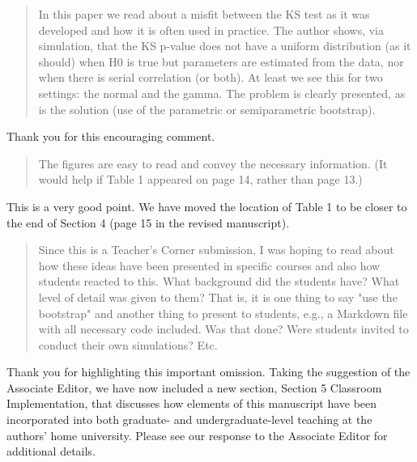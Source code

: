 \documentclass[12pt]{article}
\newenvironment{comment}%
{\begin{quotation}\noindent\small\it\color{darkblue}\ignorespaces%
}{\end{quotation}}
\begin{document}
\begin{comment}
In this paper we read about a misfit between the KS test as it was developed and 
how it is often used in practice. The author shows, via simulation, that the KS 
p-value does not have a uniform distribution (as it should) when H0 is true but 
parameters are estimated from the data, nor when there is serial correlation 
(or both). At least we see this for two settings: the normal and the gamma. The 
problem is clearly presented, as is the solution (use of the parametric or 
semiparametric bootstrap).
\end{comment}


Thank you for this encouraging comment.  


\begin{comment}
The figures are easy to read and convey the necessary information. (It would 
help if Table 1 appeared on page 14, rather than page 13.)
\end{comment}


This is a very good point.  We have moved the location of Table 1 to be closer 
to the end of Section 4 (page 15 in the revised manuscript).  


\begin{comment}
Since this is a Teacher's Corner submission, I was hoping to read about how 
these ideas have been presented in specific courses and also how students 
reacted to this. What background did the students have? What level of detail 
was given to them? That is, it is one thing to say "use the bootstrap" and 
another thing to present to students, e.g., a Markdown file with all necessary
code included. Was that done? Were students invited to conduct their own 
simulations? Etc.
\end{comment} 


Thank you for highlighting this important omission. Taking the suggestion of the 
Associate Editor, we have now included a new section, Section 5 Classroom 
Implementation, that discusses how elements of
this manuscript have been incorporated into both graduate- and 
undergraduate-level teaching at the authors' home university. 
Please see our response to the Associate Editor for additional details. 

%
%
\end{document}
